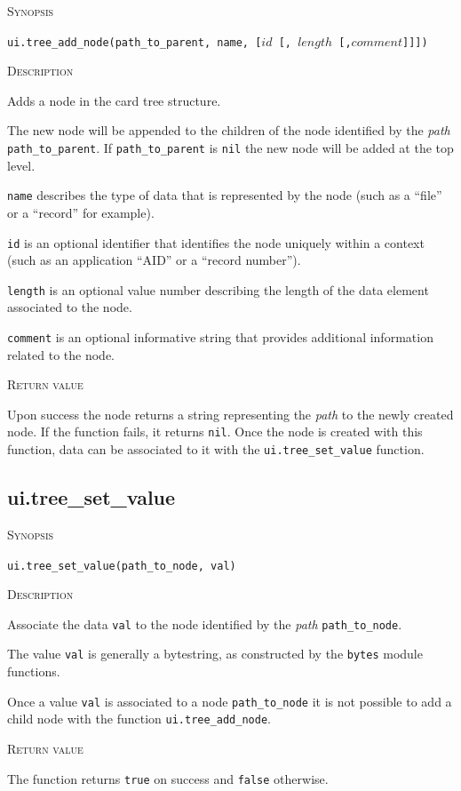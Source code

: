 \documentclass[11pt]{report}
\newcommand{\mansection}[1]{\vspace{0.5em}\par\noindent\textsc{#1}\vspace{0.5em}\par}
\begin{document}
\mansection{Synopsis}
\texttt{ui.tree\_add\_node(path\_to\_parent, name, [$id$ [, $length$ [,$comment$]]])}

\mansection{Description}
  Adds a node in the card tree structure. 

  The new node will be appended to the children of the node identified by the 
  \emph{path} \texttt{path\_to\_parent}.
  If \texttt{path\_to\_parent} is \texttt{nil} the new node will be added at 
  the top level.

  \texttt{name} describes the type of data that is represented by the node 
  (such as a ``file'' or a ``record'' for example). 

  \texttt{id} is an optional identifier that identifies the node uniquely within 
  a context (such as an application ``AID'' or a ``record number'').

  \texttt{length} is an optional value number describing the length of the 
  data element associated to the node.

  \texttt{comment} is an optional informative string that provides additional 
  information related to the node.
  
\mansection{Return value}
  Upon success the node returns a string representing the \emph{path} to the 
  newly created node. 
  If the function fails, it returns \texttt{nil}.
  Once the node is created with this function, data can be associated to it with the \texttt{ui.tree\_set\_value} function.


\subsection{ui.tree\_set\_value}

\mansection{Synopsis}
\texttt{ui.tree\_set\_value(path\_to\_node, val)}

\mansection{Description}
  Associate the data \texttt{val} to the node identified by the \emph{path} 
  \texttt{path\_to\_node}.

  The value \texttt{val} is generally a bytestring, 
  as constructed by the \texttt{bytes} module functions.

  Once a value \texttt{val} is associated to a node \texttt{path\_to\_node} 
  it is not possible to add a child node with the function \texttt{ui.tree\_add\_node}.
	  
\mansection{Return value}
  The function returns \texttt{true} on success and \texttt{false} otherwise.
\end{document}
